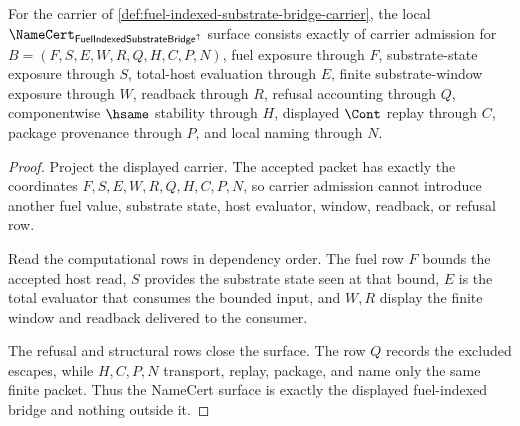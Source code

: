 \begin{theorem}
\label{thm:fuel-indexed-substrate-bridge-obligation-surface}
For the carrier of \autoref{def:fuel-indexed-substrate-bridge-carrier}, the local $\NameCert_{\FuelIndexedSubstrateBridgeUp}$ surface consists exactly of carrier admission for $B=(F,S,E,W,R,Q,H,C,P,N)$, fuel exposure through $F$, substrate-state exposure through $S$, total-host evaluation through $E$, finite substrate-window exposure through $W$, readback through $R$, refusal accounting through $Q$, componentwise $\hsame$ stability through $H$, displayed $\Cont$ replay through $C$, package provenance through $P$, and local naming through $N$.
\end{theorem}
\begin{proof}
Project the displayed carrier. The accepted packet has exactly the coordinates $F,S,E,W,R,Q,H,C,P,N$, so carrier admission cannot introduce another fuel value, substrate state, host evaluator, window, readback, or refusal row.

Read the computational rows in dependency order. The fuel row $F$ bounds the accepted host read, $S$ provides the substrate state seen at that bound, $E$ is the total evaluator that consumes the bounded input, and $W,R$ display the finite window and readback delivered to the consumer.

The refusal and structural rows close the surface. The row $Q$ records the excluded escapes, while $H,C,P,N$ transport, replay, package, and name only the same finite packet. Thus the NameCert surface is exactly the displayed fuel-indexed bridge and nothing outside it.
\end{proof}

